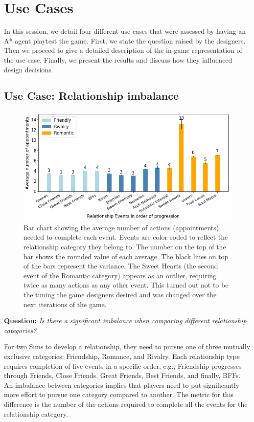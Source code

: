 \documentclass[letterpaper]{article} %
\begin{document}
\section{Use Cases}

In this session, we detail four different use cases that were assessed by having an A* agent playtest the game. First, we state the question raised by the designers. Then we proceed to give a detailed description of the in-game representation of the use case. Finally, we present the results and discuss how they influenced design decisions.

\subsection{Use Case: Relationship imbalance}

\begin{figure}[th]
  \centering
  \includegraphics[width=1.0\linewidth]{images/relationship_viz.png}
  \caption{Bar chart showing the average number of actions (appointments) needed to complete each event. Events are color coded to reflect the relationship category they belong to. The number on the top of the bar shows the rounded value of each average. The black lines on top of the bars represent the variance. The Sweet Hearts (the second event of the Romantic category) appears as an outlier, requiring twice as many actions as any other event. This turned out not to be the tuning the game designers desired and was changed over the next iterations of the game.}
  \label{Figure:bar_char_relationships}
\end{figure}

\textbf{Question:} {\em Is there a significant imbalance when comparing different relationship categories?}

For two Sims to develop a relationship, they need to pursue one of three mutually exclusive categories: Friendship, Romance, and Rivalry. Each relationship type requires completion of five events in a specific order, e.g., Friendship progresses through Friends, Close Friends, Great Friends, Best Friends, and finally, BFFs. An imbalance between categories implies that players need to put significantly more effort to pursue one category compared to another. The metric for this difference is the number of the actions required to complete all the events for the relationship category.
\end{document}
